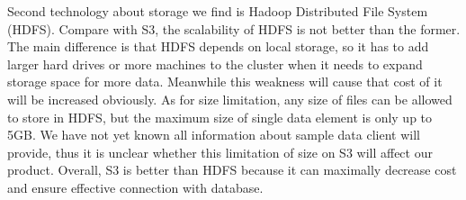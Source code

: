         \noindent Second technology about storage we find is Hadoop Distributed File System (HDFS). Compare with S3, the scalability of HDFS is not better than the former. The main difference is that HDFS depends on local storage, so it has to add larger hard drives or more machines to the cluster when it needs to expand storage space for more data\cite{Z3}. Meanwhile this weakness will cause that cost of it will be increased obviously. As for size limitation, any size of files can be allowed to store in HDFS, but the maximum size of single data element is only up to 5GB. We have not yet known all information about sample data client will provide, thus it is unclear whether this limitation of size on S3 will affect our product. Overall, S3 is better than HDFS because it can maximally decrease cost and ensure effective connection with database. 
